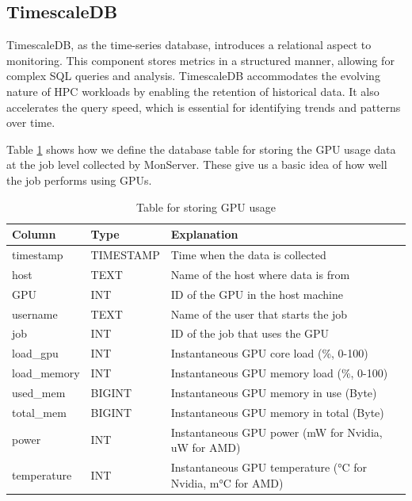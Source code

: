 \subsection{TimescaleDB}
TimescaleDB, as the time-series database, introduces a relational aspect to monitoring. This component stores metrics in a structured manner, allowing for complex SQL queries and analysis. TimescaleDB accommodates the evolving nature of HPC workloads by enabling the retention of historical data. It also accelerates the query speed, which is essential for identifying trends and patterns over time.

Table \ref{tab:gpu_usage} shows how we define the database table for storing the GPU usage data at the job level collected by MonServer. These give us a basic idea of how well the job performs using GPUs.

\begin{table}[H]
    \centering
    \begin{tabular}{|l|l|l|}
        \hline
        Column & Type & Explanation \\
        \hline
        timestamp & TIMESTAMP & Time when the data is collected \\
        host & TEXT & Name of the host where data is from \\
        GPU & INT & ID of the GPU in the host machine \\
        username & TEXT & Name of the user that starts the job \\
        job & INT & ID of the job that uses the GPU \\
        load\_gpu & INT & Instantaneous GPU core load (\%, 0-100) \\
        load\_memory & INT & Instantaneous GPU memory load (\%, 0-100) \\
        used\_mem & BIGINT & Instantaneous GPU memory in use (Byte) \\
        total\_mem & BIGINT & Instantaneous GPU memory in total (Byte) \\
        power & INT & Instantaneous GPU power (mW for Nvidia, uW for AMD) \\
        temperature & INT & Instantaneous GPU temperature (°C for Nvidia, m°C for AMD) \\
        \hline
    \end{tabular}
    \caption{Table for storing GPU usage}
    \label{tab:gpu_usage}
\end{table}

